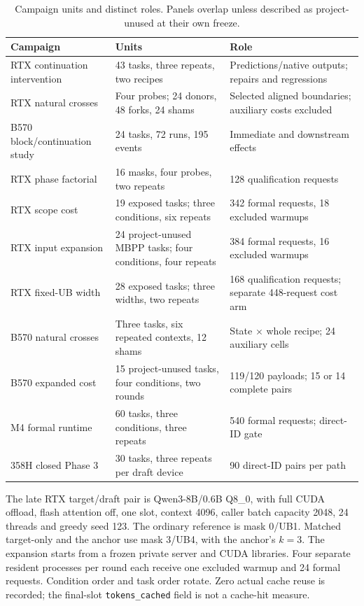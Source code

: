 \begin{table}[t]\centering\small
\caption{Campaign units and distinct roles. Panels overlap unless described as project-unused at their own freeze.}
\label{tab:study_units}
\begin{tabularx}{\linewidth}{@{}p{.30\linewidth}p{.25\linewidth}X@{}}\toprule
Campaign & Units & Role\\\midrule
RTX continuation intervention & 43 tasks, three repeats, two recipes & Predictions/native outputs; repairs and regressions\\
RTX natural crosses & Four probes; 24 donors, 48 forks, 24 shams & Selected aligned boundaries; auxiliary costs excluded\\
B570 block/continuation study & 24 tasks, 72 runs, 195 events & Immediate and downstream effects\\
RTX phase factorial & 16 masks, four probes, two repeats & 128 qualification requests\\
RTX scope cost & 19 exposed tasks; three conditions, six repeats & 342 formal requests, 18 excluded warmups\\
RTX input expansion & 24 project-unused MBPP tasks; four conditions, four repeats & 384 formal requests, 16 excluded warmups\\
RTX fixed-UB width & 28 exposed tasks; three widths, two repeats & 168 qualification requests; separate 448-request cost arm\\
B570 natural crosses & Three tasks, six repeated contexts, 12 shams & State $\times$ whole recipe; 24 auxiliary cells\\
B570 expanded cost & 15 project-unused tasks, four conditions, two rounds & 119/120 payloads; 15 or 14 complete pairs\\
M4 formal runtime & 60 tasks, three conditions, three repeats & 540 formal requests; direct-ID gate\\
358H closed Phase 3 & 30 tasks, three repeats per draft device & 90 direct-ID pairs per path\\\bottomrule
\end{tabularx}
\end{table}

The late RTX target/draft pair is Qwen3-8B/0.6B Q8\_0, with full CUDA offload, flash attention off, one slot, context 4096, caller batch capacity 2048, 24 threads and greedy seed 123. The ordinary reference is mask 0/UB1. Matched target-only and the anchor use mask 3/UB4, with the anchor's $k=3$. The expansion starts from a frozen private server and CUDA libraries. Four separate resident processes per round each receive one excluded warmup and 24 formal requests. Condition order and task order rotate. Zero actual cache reuse is recorded; the final-slot \texttt{tokens\_cached} field is not a cache-hit measure.

